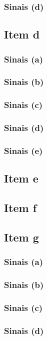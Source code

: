 \documentclass[a4paper, 12pt]{article}
\begin{document}
            \subsubsection{Sinais (d)}
        \subsection{Item d}
            \subsubsection{Sinais (a)}
            \subsubsection{Sinais (b)}
            \subsubsection{Sinais (c)}
            \subsubsection{Sinais (d)}
            \subsubsection{Sinais (e)}
        \subsection{Item e}
        \subsection{Item f}
        \subsection{Item g}
            \subsubsection{Sinais (a)}
            \subsubsection{Sinais (b)}
            \subsubsection{Sinais (c)}
            \subsubsection{Sinais (d)}
\end{document}

